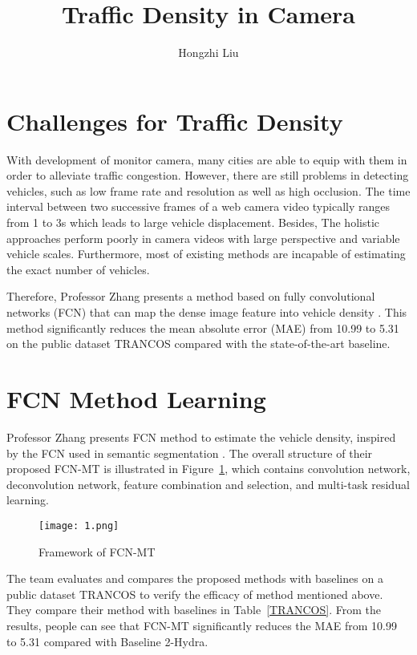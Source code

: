 \documentclass[twocolumn]{article}
\title{Traffic Density in Camera}
\author{Hongzhi Liu}
\begin{document}
\maketitle
\par
\section{Challenges for Traffic Density}
	With development of monitor camera, many cities are able to equip with them in order to alleviate traffic congestion. However, there are still problems in detecting vehicles, such as low frame rate and resolution as well as high occlusion. The time interval between two successive frames of a web camera video typically ranges from 1 to 3s which leads to large vehicle displacement. Besides, The holistic approaches perform poorly in camera videos with large perspective and variable vehicle scales. Furthermore, most of existing methods are incapable of estimating the exact number of vehicles.
	
	Therefore, Professor Zhang presents a method based on fully convolutional networks (FCN) that can map the dense image feature into vehicle density \cite{1}. This method significantly reduces the mean absolute error (MAE) from 10.99 to 5.31 on the public dataset TRANCOS compared with the state-of-the-art baseline.
	
\section{FCN Method Learning}	

    Professor Zhang presents FCN method to estimate the vehicle density, inspired by the FCN used in semantic segmentation \cite{2}. The overall structure of their proposed FCN-MT is illustrated in Figure~\ref{fig-FCN}, which contains convolution network, deconvolution network, feature combination and selection, and multi-task residual learning. 

\begin{figure}[htbp]
	\centering
	\texttt{[image: 1.png]}
	\caption{Framework of FCN-MT} \label{fig-FCN}
\end{figure}

    The team evaluates and compares the proposed methods with baselines on a public dataset TRANCOS to verify the efficacy of method mentioned above. They compare their method with baselines in Table~\ref{TRANCOS}. From the results, people can see that FCN-MT significantly reduces the MAE from 10.99 to 5.31 compared with Baseline 2-Hydra.
    
\end{document}
